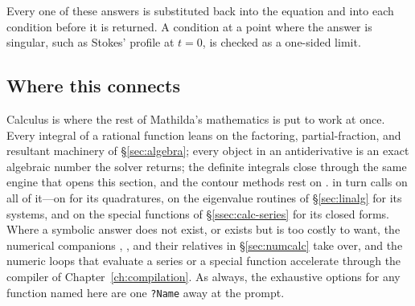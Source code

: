 \begin{codepairs}
\end{codepairs}

Every one of these answers is substituted back into the equation and into each
condition before it is returned. A condition at a point where the answer is singular,
such as Stokes' profile at \(t=0\), is checked as a one-sided limit.


\subsection*{Where this connects}

Calculus is where the rest of Mathilda's mathematics is put to work at once.
Every integral of a rational function leans on the factoring, partial-fraction,
and resultant machinery of \S\ref{sec:algebra}; every  object in an
antiderivative is an exact algebraic number the solver returns; the definite
integrals close through the same  engine that opens this section, and the
contour methods rest on .  in turn calls on all of it---on
 for its quadratures, on the eigenvalue routines of \S\ref{sec:linalg}
for its systems, and on the special functions of \S\ref{ssec:calc-series} for its
closed forms. Where a symbolic answer does not exist, or exists but is too costly
to want, the numerical companions , , and their relatives
in \S\ref{sec:numcalc} take over, and the numeric loops that evaluate a
series or a special function accelerate through the compiler of
Chapter~\ref{ch:compilation}. As always, the exhaustive options for any function
named here are one \texttt{?Name} away at the prompt.
